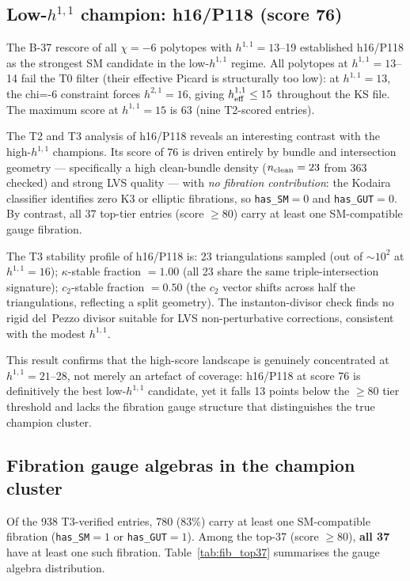 \documentclass[11pt,a4paper]{article}
\newcommand{\hone}{h^{1,1}}
\begin{document}
\subsection{Low-$h^{1,1}$ champion: h16/P118 (score 76)}
\label{sec:lowh11}

The B-37 rescore of all $\chi=-6$ polytopes with $h^{1,1}=13$--19
established h16/P118 as the strongest SM candidate in the low-$h^{1,1}$ regime.
All polytopes at $h^{1,1} = 13$--14 fail the T0 filter
(their effective Picard is structurally too low): at $h^{1,1}=13$,
the chi=-6 constraint forces $h^{2,1}=16$, giving $\hone_{\rm eff} \leq 15$
throughout the KS file.
The maximum score at $h^{1,1}=15$ is 63 (nine T2-scored entries).

The T2 and T3 analysis of h16/P118 reveals an interesting contrast
with the high-$h^{1,1}$ champions.
Its score of 76 is driven entirely by bundle and intersection geometry
--- specifically a high clean-bundle density
($n_{\rm clean}=23$ from 363 checked) and strong LVS quality
--- with \emph{no fibration contribution}:
the Kodaira classifier identifies zero K3 or elliptic fibrations,
so \texttt{has\_SM}$=0$ and \texttt{has\_GUT}$=0$.
By contrast, all 37 top-tier entries (score $\geq 80$) carry
at least one SM-compatible gauge fibration.

The T3 stability profile of h16/P118 is:
23 triangulations sampled (out of $\sim 10^2$ at $h^{1,1}=16$);
$\kappa$-stable fraction $=1.00$ (all 23 share the same triple-intersection
signature); $c_2$-stable fraction $=0.50$ (the $c_2$ vector shifts
across half the triangulations, reflecting a split geometry).
The instanton-divisor check finds no rigid del~Pezzo divisor suitable
for LVS non-perturbative corrections, consistent with the modest
$h^{1,1}$.

This result confirms that the high-score landscape is genuinely
concentrated at $h^{1,1}=21$--28, not merely an artefact of coverage:
h16/P118 at score 76 is definitively the best low-$h^{1,1}$ candidate,
yet it falls 13 points below the $\geq 80$ tier threshold and lacks the
fibration gauge structure that distinguishes the true champion cluster.

\subsection{Fibration gauge algebras in the champion cluster}
\label{sec:fib_cluster}

Of the 938 T3-verified entries, 780 (83\%) carry at least one 
SM-compatible fibration (\texttt{has\_SM}$=1$ or \texttt{has\_GUT}$=1$).
Among the top-37 (score $\geq 80$), \textbf{all 37} have at
least one such fibration.
Table~\ref{tab:fib_top37} summarises the gauge algebra distribution.
\end{document}
